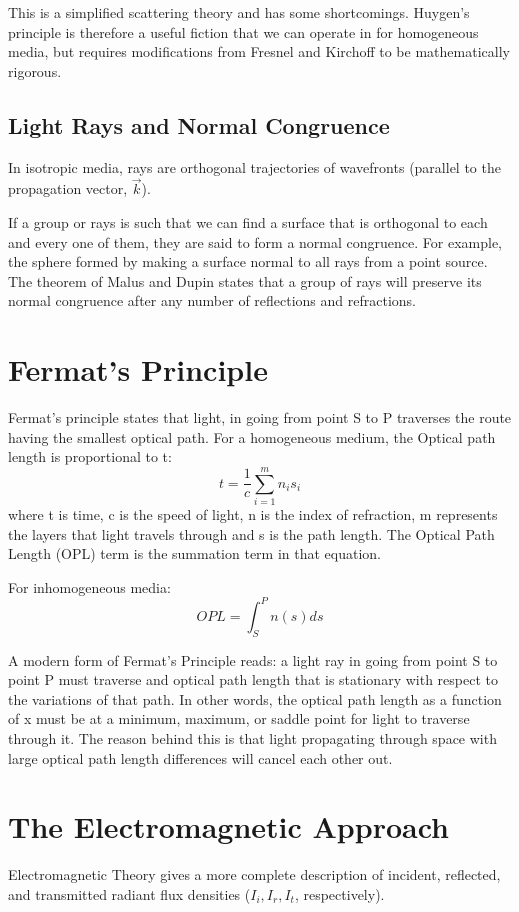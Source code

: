 \documentclass[12pt]{report}
\begin{document}
This is a simplified scattering theory and has some shortcomings. Huygen's principle is therefore a useful fiction that we can operate in for homogeneous media, but requires modifications from Fresnel and Kirchoff to be mathematically rigorous.
\subsection{Light Rays and Normal Congruence}
In isotropic media, rays are orthogonal trajectories of wavefronts (parallel to the propagation vector, $\vec{k}$).

If a group or rays is such that we can find a surface that is orthogonal to each and every one of them, they are said to form a normal congruence. For example, the sphere formed by making a surface normal to all rays from a point source. The theorem of Malus and Dupin states that a group of rays will preserve its normal congruence after any number of reflections and refractions. 
\section{Fermat's Principle}
Fermat's principle states that light, in going from point S to P traverses the route having the smallest optical path. For a homogeneous medium, the Optical path length is proportional to t:
\begin{equation}
t = \frac{1}{c}\sum_{i=1}^m n_is_i
\end{equation}
where t is time, c is the speed of light, n is the index of refraction, m represents the layers that light travels through and s is the path length. The Optical Path Length (OPL) term is the summation term in that equation.

For inhomogeneous media:
\begin{equation}
OPL = \int_S^P n(s) ds
\end{equation}

A modern form of Fermat's Principle reads: a light ray in going from point S to point P must traverse and optical path length that is stationary with respect to the variations of that path. In other words, the optical path length as a function of x must be at a minimum, maximum, or saddle point for light to traverse through it. The reason behind this is that light propagating through space with large optical path length differences will cancel each other out. 

\section{The Electromagnetic Approach}
Electromagnetic Theory gives a more complete description of incident, reflected, and transmitted radiant flux densities ($I_i, I_r, I_t$, respectively).
\end{document}
